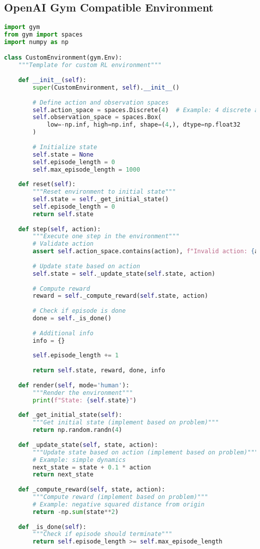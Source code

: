 \subsection{OpenAI Gym Compatible Environment}

\begin{lstlisting}[language=Python, caption=Custom Environment Template]
import gym
from gym import spaces
import numpy as np

class CustomEnvironment(gym.Env):
    """Template for custom RL environment"""
    
    def __init__(self):
        super(CustomEnvironment, self).__init__()
        
        # Define action and observation spaces
        self.action_space = spaces.Discrete(4)  # Example: 4 discrete actions
        self.observation_space = spaces.Box(
            low=-np.inf, high=np.inf, shape=(4,), dtype=np.float32
        )
        
        # Initialize state
        self.state = None
        self.episode_length = 0
        self.max_episode_length = 1000
    
    def reset(self):
        """Reset environment to initial state"""
        self.state = self._get_initial_state()
        self.episode_length = 0
        return self.state
    
    def step(self, action):
        """Execute one step in the environment"""
        # Validate action
        assert self.action_space.contains(action), f"Invalid action: {action}"
        
        # Update state based on action
        self.state = self._update_state(self.state, action)
        
        # Compute reward
        reward = self._compute_reward(self.state, action)
        
        # Check if episode is done
        done = self._is_done()
        
        # Additional info
        info = {}
        
        self.episode_length += 1
        
        return self.state, reward, done, info
    
    def render(self, mode='human'):
        """Render the environment"""
        print(f"State: {self.state}")
    
    def _get_initial_state(self):
        """Get initial state (implement based on problem)"""
        return np.random.randn(4)
    
    def _update_state(self, state, action):
        """Update state based on action (implement based on problem)"""
        # Example: simple dynamics
        next_state = state + 0.1 * action
        return next_state
    
    def _compute_reward(self, state, action):
        """Compute reward (implement based on problem)"""
        # Example: negative squared distance from origin
        return -np.sum(state**2)
    
    def _is_done(self):
        """Check if episode should terminate"""
        return self.episode_length >= self.max_episode_length
\end{lstlisting}

